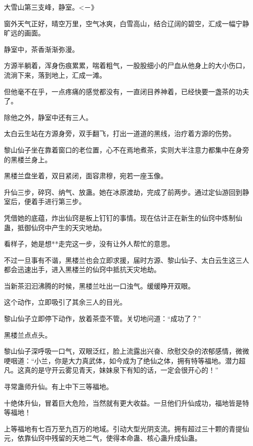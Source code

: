 
\begin{this_body}

大雪山第三支峰，静室。<－》

窗外天气正好，晴空万里，空气冰爽，白雪高山，结合辽阔的碧空，汇成一幅宁静旷远的画面。

静室中，茶香渐渐弥漫。

方源半躺着，浑身伤痕累累，喘着粗气，一股股细小的尸血从他身上的大小伤口，流淌下来，落到地上，汇成一滩。

但他毫不在乎，一点疼痛的感觉都没有，一直闭目养神着，已经快要一盏茶的功夫了。

除他之外，静室中还有三人。

太白云生站在方源身旁，双手翻飞，打出一道道的黑线，治疗着方源的伤势。

黎山仙子坐在靠着窗口的老位置，心不在焉地煮茶，实则大半注意力都集中在身旁的黑楼兰身上。

黑楼兰盘坐着，双目紧闭，面容肃穆，宛若一座玉像。

升仙三步，碎窍、纳气、放蛊。她在冰原渡劫，完成了前两步。通过定仙游回到静室后，便着手进行第三步。

凭借她的底蕴，炸出仙窍是板上钉钉的事情。现在估计正在新生的仙窍中炼制仙蛊，抵御仙窍中产生的天灾地劫。

看样子，她是想**走完这一步，没有让外人帮忙的意思。

不过一旦事有不谐，黑楼兰也会立即求援，届时方源、黎山仙子、太白云生这三人都会迅速出手，进入黑楼兰的仙窍中抵抗天灾地劫。

当新茶汩汩沸腾的时候，黑楼兰吐出一口浊气。缓缓睁开双眼。

这个动作，立即吸引了其余三人的目光。

黎山仙子立即停下动作，放着茶壶不管。关切地问道：“成功了？”

黑楼兰点点头。

黎山仙子深呼吸一口气，双眼泛红，脸上流露出兴奋、欣慰交杂的浓郁感情，微微哽咽道：“小兰，你是大力真武体，如今成为了绝仙之体，拥有特等福地。潜力超凡。这真的是守开云雾见青天，妹妹泉下有知的话，一定会很开心的！”

寻常蛊师升仙。有上中下三等福地。

十绝体升仙，冒着巨大危险，当然就有更大收益。一旦他们升仙成功，福地皆是特等福地！

上等福地有七百万至九百万的地域。引动大型光阴支流。拥有超过三十颗的青提仙元，依靠仙窍中残留的天地二气，使得本命蛊、核心蛊升成仙蛊。


\end{this_body}

